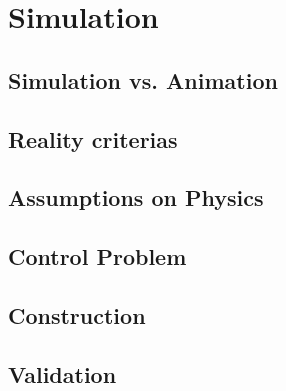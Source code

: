 
\chapter{Simulation}
\label{chap:simulation}

\section{Simulation vs. Animation}
\label{sec:simulation_animation}

\section{Reality criterias}
\label{sec:reality}

\section{Assumptions on Physics}
\label{sec:physics}

\section{Control Problem}
\label{sec:control_problem}

\section{Construction}
\label{sec:construction}

\section{Validation}
\label{sec:validation}

